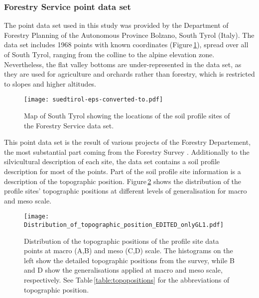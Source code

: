 \documentclass[preprint,12pt,authoryear]{elsarticle}
\begin{document}
\subsubsection{Forestry Service point data set}
The point data set used in this study was provided by the Department of Forestry Planning of the Autonomous Province Bolzano, South Tyrol (Italy).
The data set includes 1968 points with known coordinates (Figure\,\ref{fig:datapoints}), spread over all of South Tyrol, ranging from the colline to the alpine elevation zone. Nevertheless, the flat valley bottoms are under-represented in the data set, as they are used for agriculture and orchards rather than forestry, which is restricted to slopes and higher altitudes.
\begin{figure}
\texttt{[image: suedtirol-eps-converted-to.pdf]}
\caption{Map of South Tyrol showing the locations of the soil profile sites of the Forestry Service data set.}
\label{fig:datapoints}
\end{figure}
 This point data set is the result of  various projects of the Forestry Departement, the most substantial part coming from the Forestry Survey \citep{APB2006}. Additionally to the silvicultural description of each site, the data set contains a soil profile description for most of the points. Part of the soil profile site information is a description of the topographic position. Figure\,\ref{fig:hist} shows the distribution of the profile sites' topographic positions at different levels of generalisation for macro and meso scale.

\begin{figure}
\texttt{[image: Distribution\_of\_topographic\_position\_EDITED\_onlyGL1.pdf]}
\caption{Distribution of the topographic positions of the profile site data points at macro (A,B) and meso (C,D) scale. The histograms on the left show the detailed topographic positions from the survey, while B and D show the generalisations applied at macro and meso scale, respectively. See Table\,\ref{table:topopositions} for the abbreviations of topographic position. }
\label{fig:hist}
\end{figure}
\end{document}

